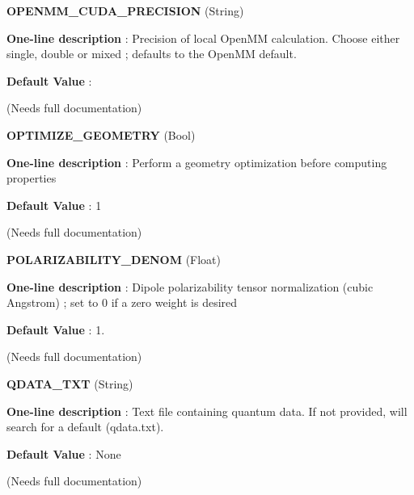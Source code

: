 \begin{DoxyItemize}
\item {\bfseries  \-O\-P\-E\-N\-M\-M\-\_\-\-C\-U\-D\-A\-\_\-\-P\-R\-E\-C\-I\-S\-I\-O\-N } (\-String) \par
{\bfseries  \-One-\/line description }\-: \-Precision of local \-Open\-M\-M calculation. \-Choose either single, double or mixed ; defaults to the \-Open\-M\-M default. \par
{\bfseries  \-Default \-Value }\-: \par
(\-Needs full documentation)\end{DoxyItemize}
\begin{DoxyItemize}
\item {\bfseries  \-O\-P\-T\-I\-M\-I\-Z\-E\-\_\-\-G\-E\-O\-M\-E\-T\-R\-Y } (\-Bool) \par
{\bfseries  \-One-\/line description }\-: \-Perform a geometry optimization before computing properties \par
{\bfseries  \-Default \-Value }\-: 1 \par
(\-Needs full documentation)\end{DoxyItemize}
\begin{DoxyItemize}
\item {\bfseries  \-P\-O\-L\-A\-R\-I\-Z\-A\-B\-I\-L\-I\-T\-Y\-\_\-\-D\-E\-N\-O\-M } (\-Float) \par
{\bfseries  \-One-\/line description }\-: \-Dipole polarizability tensor normalization (cubic \-Angstrom) ; set to 0 if a zero weight is desired \par
{\bfseries  \-Default \-Value }\-: 1. \par
(\-Needs full documentation)\end{DoxyItemize}
\begin{DoxyItemize}
\item {\bfseries  \-Q\-D\-A\-T\-A\-\_\-\-T\-X\-T } (\-String) \par
{\bfseries  \-One-\/line description }\-: \-Text file containing quantum data. \-If not provided, will search for a default (qdata.\-txt). \par
{\bfseries  \-Default \-Value }\-: \-None \par
(\-Needs full documentation)\end{DoxyItemize}
